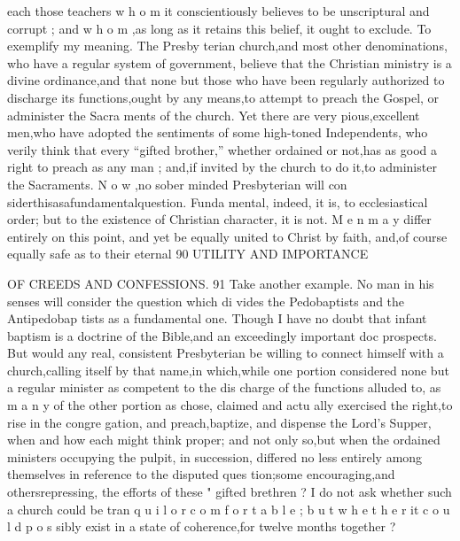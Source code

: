 \documentclass[
]{book}
\begin{document}
each those teachers w h o m it conscientiously
believes to be unscriptural and corrupt ; and
w h o m ,as long as it retains this belief, it ought to exclude.
To exemplify my meaning. The Presby terian church,and most other denominations, who have a regular system of government, believe that the Christian ministry is a divine ordinance,and that none but those who have
been regularly authorized to discharge its functions,ought by any means,to attempt to preach the Gospel, or administer the Sacra ments of the church. Yet there are very pious,excellent men,who have adopted the sentiments of some high-toned Independents, who verily think that every ``gifted brother,'' whether ordained or not,has as good a right to preach as any man ; and,if invited by the church to do it,to administer the Sacraments. N o w ,no sober minded Presbyterian will con siderthisasafundamentalquestion. Funda mental, indeed, it is, to ecclesiastical order; but to the existence of Christian character, it is not. M e n m a y differ entirely on this point, and yet be equally united to Christ by faith, and,of course equally safe as to their eternal
90 UTILITY AND IMPORTANCE

OF CREEDS AND CONFESSIONS. 91
Take another example. No man in his senses will consider the question which di vides the Pedobaptists and the Antipedobap tists as a fundamental one. Though I have no doubt that infant baptism is a doctrine of the Bible,and an exceedingly important doc
prospects. But would any real, consistent Presbyterian be willing to connect himself with a church,calling itself by that name,in which,while one portion considered none but a regular minister as competent to the dis charge of the functions alluded to, as m a n y of
the other portion as chose, claimed and actu ally exercised the right,to rise in the congre
gation, and preach,baptize, and dispense the Lord's Supper, when and how each might think proper; and not only so,but when the
ordained ministers occupying the pulpit, in succession, differed no less entirely among themselves in reference to the disputed ques
tion;some encouraging,and othersrepressing, the efforts of these " gifted brethren ? I do not ask whether such a church could be tran
q u i l o r c o m f o r t a b l e ; b u t w h e t h e r it c o u l d p o s sibly exist in a state of coherence,for twelve months together ?
\end{document}
